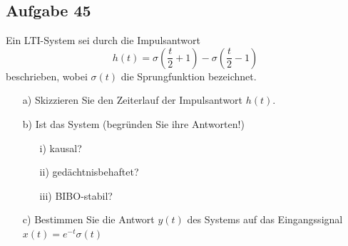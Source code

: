 \documentclass[11pt]{article}
\begin{document}
\subsection*{Aufgabe 45}
\vspace*{-0.5cm}
Ein LTI-System sei durch die Impulsantwort $$h(t) = \sigma\left(\frac{t}{2} + 1\right) - \sigma\left(\frac{t}{2}-1\right)$$ beschrieben, wobei $\sigma(t)$ die Sprungfunktion bezeichnet.
\vspace*{-0.5cm}
\begin{itemize}
    \item[a)] Skizzieren Sie den Zeiterlauf der Impulsantwort $h(t)$.
    \item[b)] Ist das System (begründen Sie ihre Antworten!)
    \begin{multicols}{3} \begin{itemize}
            \item[i)] kausal?
            \item[ii)] gedächtnisbehaftet?
            \item[iii)] BIBO-stabil?
        \end{itemize}
    \end{multicols}
    \item[c)] Bestimmen Sie die Antwort $y(t)$ des Systems auf das Eingangssignal $x(t)= e^{-t}\sigma(t)$
\end{itemize}


\pagebreak


\pagebreak
\end{document}
